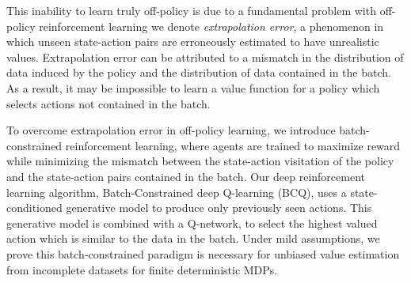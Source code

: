 \documentclass{article}
\begin{document}
This inability to learn truly off-policy is due to a fundamental problem with off-policy reinforcement learning we denote \textit{\mbox{extrapolation} \mbox{error}}, a phenomenon in which unseen state-action pairs are erroneously estimated to have unrealistic values. %
Extrapolation error can be attributed to a mismatch in the distribution of data induced by the policy and the distribution of data contained in the batch. As a result, it may be impossible to learn a value function for a policy which selects actions not contained in the batch. 


To overcome extrapolation error in off-policy learning, we introduce batch-constrained reinforcement learning, where agents are trained to maximize reward while minimizing the mismatch between the state-action visitation of the policy and the state-action pairs contained in the batch. 
Our deep reinforcement learning algorithm, Batch-Constrained deep Q-learning (BCQ), uses a state-conditioned generative model to produce only previously seen actions. This generative model is combined with a Q-network, to select the highest valued action which is similar to the data in the batch. 
Under mild assumptions, we prove this batch-constrained paradigm is necessary for unbiased value estimation from incomplete datasets for finite deterministic MDPs. 

\end{document}
